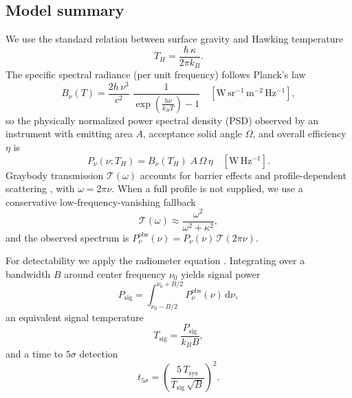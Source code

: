 \documentclass[11pt]{article}
\begin{document}
\subsection{Model summary}
We use the standard relation between surface gravity and Hawking temperature
\begin{equation}
  T_H = \frac{\hbar\,\kappa}{2\pi k_B}.
\end{equation}
The specific spectral radiance (per unit frequency) follows Planck's law
\begin{equation}
  B_{\nu}(T) = \frac{2 h \, \nu^3}{c^2} \; \frac{1}{\exp\!\left(\tfrac{h\nu}{k_B T}\right) - 1} \quad [\mathrm{W\,sr^{-1}\,m^{-2}\,Hz^{-1}}],
\end{equation}
so the physically normalized power spectral density (PSD) observed by an instrument with emitting area $A$, acceptance solid angle $\Omega$, and overall efficiency $\eta$ is
\begin{equation}
  P_{\nu}(\nu; T_H) = B_{\nu}(T_H) \; A\,\Omega\,\eta \quad [\mathrm{W\,Hz^{-1}}].
\end{equation}
Graybody transmission $\mathcal{T}(\omega)$ accounts for barrier effects and profile-dependent scattering \cite{Page1976}, with $\omega = 2\pi\nu$. When a full profile is not supplied, we use a conservative low-frequency-vanishing fallback
\begin{equation}
  \mathcal{T}(\omega) \approx \frac{\omega^2}{\omega^2 + \kappa^2},
\end{equation}
and the observed spectrum is $P^{\mathrm{obs}}_{\nu}(\nu) = P_{\nu}(\nu)\,\mathcal{T}(2\pi\nu)$.

For detectability we apply the radiometer equation \cite{Wilson2013}. Integrating over a bandwidth $B$ around center frequency $\nu_0$ yields signal power
\begin{equation}
  P_{\mathrm{sig}} = \int_{\nu_0 - B/2}^{\nu_0 + B/2} P^{\mathrm{obs}}_{\nu}(\nu)\,\mathrm{d}\nu,
\end{equation}
an equivalent signal temperature
\begin{equation}
  T_{\mathrm{sig}} = \frac{P_{\mathrm{sig}}}{k_B B},
\end{equation}
and a time to $5\sigma$ detection
\begin{equation}
  t_{5\sigma} = \left( \frac{5\, T_{\mathrm{sys}}}{T_{\mathrm{sig}}\,\sqrt{B}} \right)^2.
\end{equation}
\end{document}
